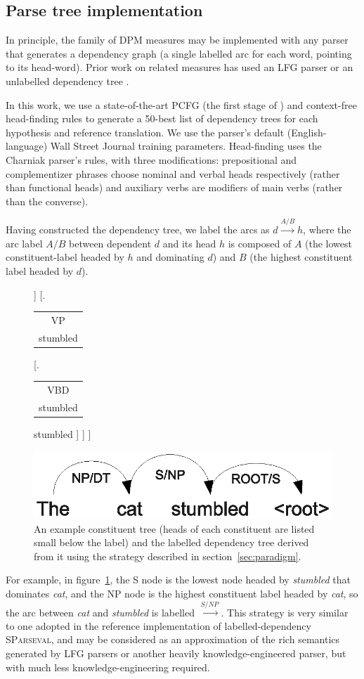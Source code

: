 \documentclass{kluwer}    %
\newcommand{\headlabel}[2]{
  \begin{tabular}{c} #1\\
    {\small #2} \end{tabular}}
\newcommand{\arclabel}[1]{\ensuremath{\stackrel{#1}{\to}}}
\begin{document}
\begin{article}
\subsection{Parse tree implementation}
In principle, the family of DPM measures may be implemented with
any parser that generates a dependency graph (a single labelled arc
for each word, pointing to its head-word). Prior work
\cite{owczarzak07labelleddepseval} on related
measures has used an LFG parser \cite{cahill04lfg} or
an unlabelled dependency tree \cite{liu05syntaxformteval}. 

In this work, we use a state-of-the-art PCFG (the first stage of
) and context-free head-finding
rules \cite{magerman95headfinding} to generate a 50-best list of
dependency trees for each hypothesis and reference translation.  We
use the parser's default (English-language) Wall Street Journal
training parameters.  Head-finding uses the Charniak parser's rules,
with three modifications: prepositional and complementizer phrases
choose nominal and verbal heads respectively (rather than functional
heads) and auxiliary verbs are modifiers of main verbs (rather than
the converse).

Having constructed the dependency tree, we label the arcs as $d
\stackrel{A/B}{\to} h$, where the arc label $A/B$ between dependent
$d$ and its head $h$ is composed of $A$ (the lowest constituent-label
headed by $h$ and dominating $d$) and $B$ (the highest constituent
label headed by $d$).
\begin{figure}
  \Tree
  [.\headlabel{S}{stumbled}
    [.\headlabel{NP}{cat}
      [.\headlabel{DT}{the} the ]
      [.\headlabel{NN}{cat} cat ]
    ]
    [.\headlabel{VP}{stumbled} 
      [.\headlabel{VBD}{stumbled} stumbled ]
    ]
  ]
  \\
  \begin{center}
    \includegraphics[scale=0.6]{dpm-example-depextract.eps}
  \end{center}
  \caption{An example constituent tree (heads of each constituent are
    listed small below the label) and the labelled dependency tree
    derived from it using the strategy described in
    section~\ref{sec:paradigm}.}
  \label{fig:depextract}
\end{figure}
For example, in figure~\ref{fig:depextract}, the S node is the lowest
node headed by \emph{stumbled} that dominates \emph{cat}, and the NP
node is the highest constituent label headed by \emph{cat}, so the arc
between \emph{cat} and \emph{stumbled} is labelled \arclabel{S/NP}.
%
This strategy is very similar to one adopted in the reference
implementation of labelled-dependency \textsc{SParseval}, and may be
considered as an approximation of the rich semantics generated by LFG
parsers \cite{cahill04lfg} or another heavily knowledge-engineered
parser, but with much less knowledge-engineering required.


\end{article}
\end{document}
